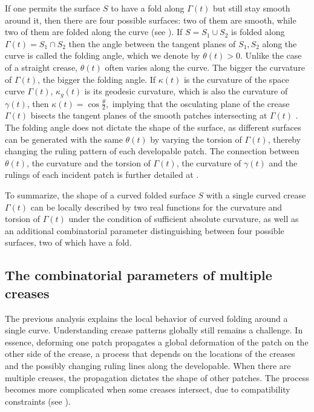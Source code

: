 If one permits the surface $S$ to have a fold along $\Gamma(t)$ but still stay smooth around it, then there are four possible surfaces: two of them are smooth, while two of them are folded along the curve (see ). If $S = S_1 \cup S_2$ is folded along $\Gamma(t) = S_1 \cap S_2$ then the angle between the tangent planes of $S_1,S_2$ along the curve is called the folding angle, which we denote by $\theta(t) > 0$. Unlike the case of a straight crease, $\theta(t)$ often varies along the curve.  The bigger the curvature of $\Gamma(t)$, the bigger the folding angle. If $\kappa(t)$ is the curvature of the space curve $\Gamma(t)$, $\kappa_g(t)$ is its geodesic curvature, which is also the curvature of $\gamma(t)$, then $\kappa(t) = \cos\frac{\theta}{2},$ implying that the osculating plane of the crease $\Gamma(t)$ bisects the tangent planes of the smooth patches intersecting at $\Gamma(t)$ \cite{curved_folding_kilian,duncan_folded}. The folding angle does not dictate the shape of the surface, as different surfaces can be generated with the same $\theta(t)$ by varying the torsion of $\Gamma(t)$, thereby changing the ruling pattern of each developable patch. The connection between $\theta(t)$, the curvature and the torsion of $\Gamma(t)$, the curvature of $\gamma(t)$ and the rulings of each incident patch is further detailed at \cite{demaine2018conic}.

To summarize, the shape of a curved folded surface $S$ with a single curved crease $\Gamma(t)$ can be locally described by two {real functions} for the curvature and torsion of $\Gamma(t)$ under the condition of sufficient absolute curvature, as well as an additional combinatorial parameter distinguishing between four possible surfaces, two of which have a fold.
 
\subsection{The combinatorial parameters of multiple creases}
The previous analysis explains the local behavior of curved folding around a single curve. Understanding crease patterns globally still remains a challenge. In essence, deforming one patch propagates a global deformation of the patch on the other side of the crease, a process that depends on the locations of the creases and the possibly changing ruling lines along the developable. When there are multiple creases, the propagation dictates the shape of other patches. The process becomes more complicated when some creases intersect, due to compatibility constraints (see ). 

